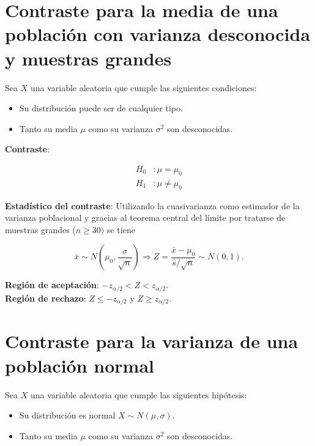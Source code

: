 \documentclass[
  a4paper,
]{scrreport}
\providecommand{\tightlist}{%
  \setlength{\itemsep}{0pt}\setlength{\parskip}{0pt}}\usepackage{longtable,booktabs,array}
\theoremstyle{plain}
\theoremstyle{definition}
\theoremstyle{definition}
\theoremstyle{remark}
\begin{document}
\section{Contraste para la media de una población con varianza
desconocida y muestras
grandes}\label{contraste-para-la-media-de-una-poblaciuxf3n-con-varianza-desconocida-y-muestras-grandes}

Sea \(X\) una variable aleatoria que cumple las siguientes condiciones:

\begin{itemize}
\tightlist
\item
  Su distribución puede ser de cualquier tipo.
\item
  Tanto su media \(\mu\) como su varianza \(\sigma^2\) son desconocidas.
\end{itemize}

\textbf{Contraste}:

\begin{align*}
H_0 &: \mu=\mu_0 \\
H_1 &: \mu\neq \mu_0
\end{align*}

\textbf{Estadístico del contraste}: Utilizando la cuasivarianza como
estimador de la varianza poblacional y gracias al teorema central del
límite por tratarse de muestras grandes (\(n\geq 30)\) se tiene

\[
\bar x\sim N\left(\mu_0,\frac{\sigma}{\sqrt{n}}\right) \Rightarrow Z=\frac{\bar x-\mu_0}{\hat s/\sqrt{n}}\sim N(0,1).
\]

\textbf{Región de aceptación}: \(-z_{\alpha/2}< Z < z_{\alpha/2}\).\\
\textbf{Región de rechazo}: \(Z\leq -z_{\alpha/2}\) y
\(Z\geq z_{\alpha/2}\).

\section{Contraste para la varianza de una población
normal}\label{contraste-para-la-varianza-de-una-poblaciuxf3n-normal}

Sea \(X\) una variable aleatoria que cumple las siguientes hipótesis:

\begin{itemize}
\tightlist
\item
  Su distribución es normal \(X\sim N(\mu,\sigma)\).
\item
  Tanto su media \(\mu\) como su varianza \(\sigma^2\) son desconocidas.
\end{itemize}
\end{document}
